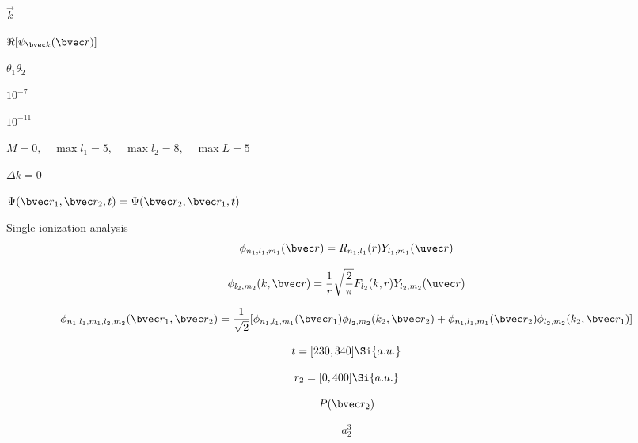 $\vec k$

$\Re [\psi_{\bvec k}(\bvec r)]$

$\theta_1 \theta_2$

$10^{-7}$

$10^{-11}$

$M = 0, \quad\max{l_1} = 5, \quad\max{l_2} = 8, \quad\max{L} = 5$

$\Delta k = 0$

$\Psi(\bvec r_1, \bvec r_2, t) = \Psi(\bvec r_2, \bvec r_1, t)$

Single ionization analysis
\begin{equation}
\phi_{n_1, l_1, m_1}(\bvec r) = R_{n_1,l_1}(r)Y_{l_1,m_1}(\uvec r)
\end{equation}

\begin{equation}
\phi_{l_2, m_2}(k, \bvec r) = \frac{1}{r}\sqrt{\frac{2}{\pi}} F_{l_2}(k, r) Y_{l_2, m_2} (\uvec r)
\end{equation}

\begin{equation}
\phi_{n_1, l_1, m_1, l_2, m_2}(\bvec r_1, \bvec r_2) = \frac{1}{\sqrt{2}} [\phi_{n_1, l_1, m_1}(\bvec r_1)\phi_{l_2, m_2}(k_2, \bvec r_2) + \phi_{n_1, l_1, m_1}(\bvec r_2)\phi_{l_2, m_2}(k_2, \bvec r_1)]
\end{equation}

\begin{equation}
t = [230, 340] \Si{a.u.}
\end{equation}

\begin{equation}
r_2 = [0,400] \Si{a.u.}
\end{equation}

\begin{equation}
P(\bvec r_2)
\end{equation}

\begin{equation}
a_2^3
\end{equation}
